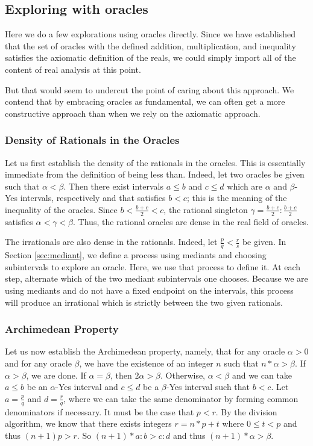\documentclass[12pt]{article}
\theoremstyle{remark}
\begin{document}
\subsection{Exploring with oracles}

Here we do a few explorations using oracles directly. Since we have established that the set of oracles with the defined addition, multiplication, and inequality satisfies the axiomatic definition of the reals, we could simply import all of the content of real analysis at this point. 

But that would seem to undercut the point of caring about this approach. We contend that by embracing oracles as fundamental, we can often get a more constructive approach than when we rely on the axiomatic approach. 

\subsubsection{Density of Rationals in the Oracles}

Let us first establish the density of the rationals in the oracles. This is essentially immediate from the definition of being less than. Indeed, let two oracles be given such that $\alpha < \beta$. Then there exist intervals $a\leq b$ and $c\leq d$ which are $\alpha$ and $\beta$-Yes intervals, respectively and that satisfies $b < c$; this is the meaning of the inequality of the oracles. Since $b < \frac{b+c}{2} < c$, the rational singleton $\gamma = \frac{b+c}{2}:\frac{b+c}{2}$ satisfies $\alpha < \gamma < \beta$. Thus, the rational oracles are dense in the real field of oracles. 

The irrationals are also dense in the rationals. Indeed, let $\frac{p}{q} <\frac{r}{s}$ be given. In Section \ref{sec:mediant}, we define a process using mediants and choosing subintervals to explore an oracle. Here, we use that process to define it. At each step, alternate which of the two mediant subintervals one chooses. Because we are using mediants and do not have a fixed endpoint on the intervals, this process will produce an irrational which is strictly between the two given rationals. 

\subsubsection{Archimedean Property}

Let us now establish the Archimedean property, namely, that for any oracle $\alpha > 0$ and for any oracle $\beta$, we have the existence of an integer $n$ such that $n * \alpha > \beta $. If $\alpha > \beta$, we are done. If $\alpha = \beta$, then $2 \alpha > \beta$. Otherwise, $\alpha < \beta$ and we can take $a\leq b$ be an $\alpha$-Yes interval and $c \leq d$ be a $\beta$-Yes interval such that $b < c$. Let $a = \frac{p}{q}$ and $d = \frac{r}{q}$, where we can take the same denominator by forming common denominators if necessary. It must be the case that $p < r$. By the division algorithm, we know that there exists integers $r = n*p + t$ where $0 \leq  t<p$ and thus $(n+1)p > r$. So $(n+1)*a:b > c:d$ and thus $(n+1)*\alpha > \beta$.
\end{document}
